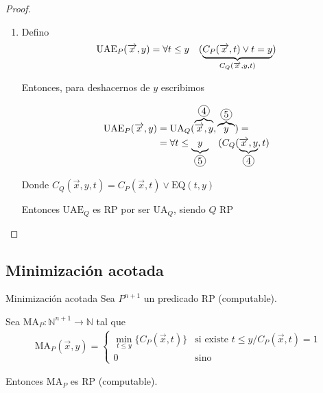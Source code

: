 \begin{proof}
\begin{enumerate}
        \item Defino
        \begin{gather*}
            \mathrm{UAE}_P(\overrightarrow{x},y) = \forall t \leq y \quad
            (\underbrace{C_P (\overrightarrow{x},t) \vee t = y}_{%
                C_Q(\overrightarrow{x},y,t)}) \\
        \end{gather*}

        Entonces, para deshacernos de $y$ escribimos

        \begin{align*}
            \mathrm{UAE}_P(\overrightarrow{x},y) &= 
            \mathrm{UA}_Q(\overbrace{\overrightarrow{x}, y}^{\circled{4}},
              \overbrace{y}^{\circled{5}}) = \\
            &= \forall t \leq \underbrace{y}_{\circled{5}} \quad 
                (C_Q(\underbrace{\overrightarrow{x}, y}_{\circled{4}}, t)
        \end{align*}

        Donde $C_Q(\overrightarrow{x}, y, t) = C_P(\overrightarrow{x},t)
        \vee \mathrm{EQ}(t,y)$

        Entonces $\mathrm{UAE}_Q$ es RP por ser $\mathrm{UA}_Q$, siendo $Q$
        RP
    \end{enumerate}
\end{proof}

\subsection{Minimización acotada}

\begin{teorema}{Minimización acotada}{}
    Sea $P^{n+1}$ un predicado RP (computable).

    Sea $\mathrm{MA}_P: \mathbb{N}^{n+1} \to \mathbb{N}$ tal que
    \begin{gather*}
        \mathrm{MA}_P (\overrightarrow{x}, y) = \begin{cases}
            \min_{t \leq y}{\{ C_P (\overrightarrow{x},t) \}} & \text{si 
            existe } t \leq y / C_P (\overrightarrow{x},t) = 1 \\
            0 & \text{sino}
        \end{cases}
    \end{gather*}

    \medskip

    Entonces $\mathrm{MA}_P$ es RP (computable).
\end{teorema}

